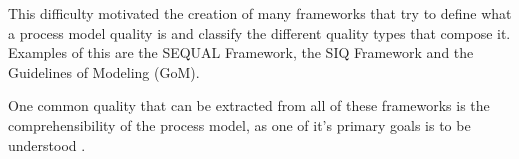 \documentclass{llncs}
\begin{document}



This difficulty motivated the creation of many frameworks that try to define what a process model quality is and classify the different quality types that compose it. Examples of this are the SEQUAL Framework, the SIQ Framework and the Guidelines of Modeling (GoM).

One common quality that can be extracted from all of these frameworks is the comprehensibility of the process model, as one of it's primary goals is to be understood \cite{krogstie2012}.
\end{document}
